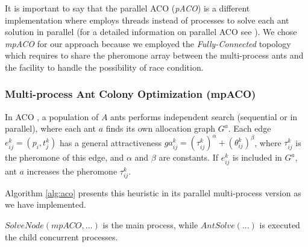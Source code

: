 \documentclass[preprint,authoryear]{elsarticle}
\begin{document}
It is important to say that the parallel ACO ({\it pACO}) is a different implementation where employs threads instead of processes to solve each ant solution in parallel (for a detailed information on parallel ACO see \cite{Pedemonte2011}). We chose {\it mpACO} for our approach because we employed the {\it Fully-Connected} topology which requires to share the pheromone array between the multi-process ants and the facility to handle the possibility of race condition.


\subsubsection{Multi-process Ant Colony Optimization (mpACO)}

In ACO \cite{Dorigo1992}, a population of $A$\/ ants performs independent search (sequential or in parallel), where each ant $a$\/ finds its own allocation graph $G^a$. Each edge $e^k_{ij}=(p_i,t^k_j)$\/ has a general attractiveness $ga^k_{ij} = (\tau^k_{ij})^\alpha + (\theta^k_{ij})^\beta$, where $\tau^k_{ij}$\/ is the pheromone of this edge, and $\alpha$\/ and $\beta$\/ are constants. If $e^k_{ij}$\/ is included in $G^a$, ant $a$\/ increases the pheromone $\tau^k_{ij}$.

Algorithm \ref{alg:aco} presents this heuristic in its parallel multi-process version as we have implemented.

$SolveNode(mpACO, ...)$ is the main process, while $AntSolve(...)$ is executed the child concurrent processes.
\end{document}
